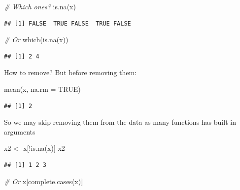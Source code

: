 \documentclass[
]{book}
\newenvironment{Shaded}{\begin{snugshade}}{\end{snugshade}}
\newcommand{\AttributeTok}[1]{\textcolor[rgb]{0.77,0.63,0.00}{#1}}
\newcommand{\CommentTok}[1]{\textcolor[rgb]{0.56,0.35,0.01}{\textit{#1}}}
\newcommand{\ConstantTok}[1]{\textcolor[rgb]{0.00,0.00,0.00}{#1}}
\newcommand{\FunctionTok}[1]{\textcolor[rgb]{0.00,0.00,0.00}{#1}}
\newcommand{\NormalTok}[1]{#1}
\newcommand{\OtherTok}[1]{\textcolor[rgb]{0.56,0.35,0.01}{#1}}
\newcommand{\SpecialCharTok}[1]{\textcolor[rgb]{0.00,0.00,0.00}{#1}}
\theoremstyle{definition}
\theoremstyle{definition}
\theoremstyle{definition}
\theoremstyle{definition}
\theoremstyle{remark}
\begin{document}
\begin{Shaded}
\begin{Highlighting}[]
\CommentTok{\# Which ones?}
\FunctionTok{is.na}\NormalTok{(x)}
\end{Highlighting}
\end{Shaded}

\begin{verbatim}
## [1] FALSE  TRUE FALSE  TRUE FALSE
\end{verbatim}

\begin{Shaded}
\begin{Highlighting}[]
\CommentTok{\# Or}
\FunctionTok{which}\NormalTok{(}\FunctionTok{is.na}\NormalTok{(x))}
\end{Highlighting}
\end{Shaded}

\begin{verbatim}
## [1] 2 4
\end{verbatim}

How to remove? But before removing them:

\begin{Shaded}
\begin{Highlighting}[]
\FunctionTok{mean}\NormalTok{(x, }\AttributeTok{na.rm =} \ConstantTok{TRUE}\NormalTok{)}
\end{Highlighting}
\end{Shaded}

\begin{verbatim}
## [1] 2
\end{verbatim}

So we may skip removing them from the data as many functions has built-in arguments

\begin{Shaded}
\begin{Highlighting}[]
\NormalTok{x2 }\OtherTok{\textless{}{-}}\NormalTok{ x[}\SpecialCharTok{!}\FunctionTok{is.na}\NormalTok{(x)]}
\NormalTok{x2}
\end{Highlighting}
\end{Shaded}

\begin{verbatim}
## [1] 1 2 3
\end{verbatim}

\begin{Shaded}
\begin{Highlighting}[]
\CommentTok{\# Or}
\NormalTok{x[}\FunctionTok{complete.cases}\NormalTok{(x)]}
\end{Highlighting}
\end{Shaded}
\end{document}
